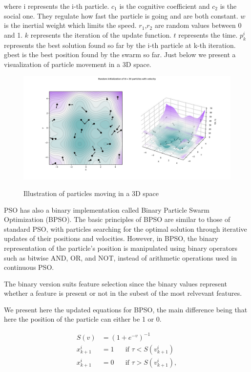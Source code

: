 \documentclass{Configuration_Files/PoliMi3i_thesis}
\begin{document}
where i represents the i-th particle. $c_1$ is the cognitive coefficient and $c_2$ is the social one. They regulate how fast the particle is going and are both constant. $w$ is the inertial weight which limits the speed. $r_1$,$r_2$ are random values between 0 and 1. $k$ represents the iteration of the update function. $t$ represents the time. $p^{i}_{k}$ represents the best solution found so far by the i-th particle at k-th iteration. gbest is the best position found by the swarm so far.
Just below we present a visualization of particle movement in a 3D space. 

\begin{figure}[H]
	\includegraphics[scale=0.35]{pso.png}
    \label{pso}
	\caption{Illustration of particles moving in a 3D space}
\end{figure}

PSO has also a binary implementation called Binary Particle Swarm Optimization (BPSO).
The basic principles of BPSO are similar to those of standard PSO, with particles searching for the optimal solution through iterative updates of their positions and velocities. However, in BPSO, the binary representation of the particle's position is manipulated using binary operators such as bitwise AND, OR, and NOT, instead of arithmetic operations used in continuous PSO. \cite{kennedyDiscreteBinaryVersion1997}

The binary version suits feature selection since the binary values represent whether a feature is present or not in the subest of the most relvevant features.

We present here the updated equations for BPSO, the main difference being that here the position of the particle can either be 1 or 0. \cite{abdullahEEGChannelSelection2022}


\begin{align}
S(v) &= \left(1+e^{-v}\right)^{-1} \\
x_{k+1}^i &=1 \:\:\:\:\:\: \text { if } \tau<S\left(v_{k+1}^i\right) \\
x_{k+1}^i &=0 \:\:\:\:\:\: \text { if } \tau>S\left(v_{k+1}^i\right),
\end{align}
\end{document}

